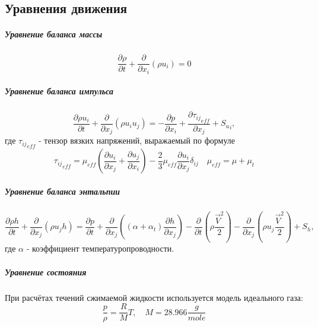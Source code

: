 \subsection{Уравнения движения}
		\subparagraph{Уравнение баланса массы\\}
			\begin{equation}
				\frac{\partial \rho}{\partial t} + \frac{\partial}{\partial x_i}(\rho u_i) = 0
			\end{equation}
		\subparagraph{Уравнение баланса импульса\\}
			\begin{equation}
				\frac{\partial \rho u_i}{\partial t} + \frac{\partial}{\partial x_j}(\rho u_iu_j) = - \frac{\partial p}{\partial x_i} + \frac{\partial {\tau_{ij}}_{eff}}{\partial x_j} + {S_u}_i,
				\label{flowEqn}
			\end{equation}
			где ${\tau_{ij}}_{eff}$ - тензор вязких напряжений, выражаемый по формуле
			\begin{equation}
				{\tau_{ij}}_{eff} = \mu_{eff}\left( \frac{\partial u_i}{\partial x_j} + \frac{\partial u_j}{\partial x_i} \right) - \frac{2}{3}\mu_{eff}\frac{\partial u_i}{\partial x_j} \delta_{ij} \quad \mu_{eff} = \mu + \mu_{t}
			\end{equation}
		\subparagraph{Уравнение баланса энтальпии\\}
		\begin{equation}
			\frac{\partial \rho h}{\partial t} + \frac{\partial}{\partial x_j} (\rho u_j h) = \frac{\partial p}{\partial t} + \frac{\partial}{\partial x_j} \left((\alpha + \alpha_t) \frac{\partial h}{\partial x_j}\right) - \frac{\partial}{\partial t}\left(\rho \frac{\vec{V}^2}{2}\right) - \frac{\partial}{\partial x_j}\left(\rho u_j \frac{\vec{V}^2}{2}\right) + S_h,
			\label{thermoEqn}
		\end{equation}
		 где $\alpha$ - коэффициент температуропроводности.
		\subparagraph{Уравнение состояния\\}
			\hspace{2em}При расчётах течений сжимаемой жидкости используется модель идеального газа:
			\begin{equation}
				\frac{p}{\rho} = \frac{R}{M}T, \quad M = 28.966 \frac{g}{mole}
			\end{equation}
		
